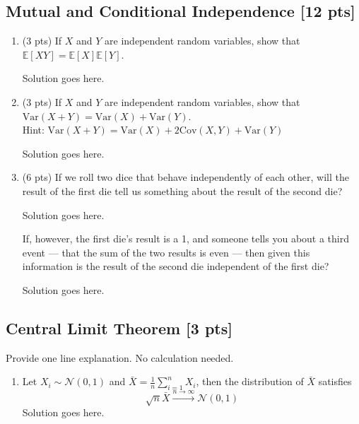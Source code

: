 \documentclass[a4paper]{article}
\theoremstyle{definition}
\newcommand{\Var}{\mathrm{Var}}
\newcommand{\Cov}{\mathrm{Cov}}
\newenvironment{soln}{
    \leavevmode\color{blue}\ignorespaces
}{}
\begin{document}
\subsection{Mutual and Conditional Independence [12 pts]}
\begin{enumerate}
\item (3 pts) If $X$ and $Y$ are independent random variables, show that
  $\mathbb{E}[XY] = \mathbb{E}[X]\mathbb{E}[Y]$.
  
  \begin{soln}  Solution goes here. \end{soln}
  
\item (3 pts) If $X$ and $Y$ are independent random variables, show that
  $\Var(X+Y) = \Var(X) + \Var(Y)$. \\
  Hint: $\Var(X+Y) = \Var(X) + 2\Cov(X, Y) + \Var(Y)$
  
  \begin{soln}  Solution goes here. \end{soln}
 
\item (6 pts) If we roll two dice that behave independently of each
  other, will the result of the first die tell us something about the
  result of the second die? 
  
  \begin{soln}  Solution goes here. \end{soln}
  
  If, however, the first die's result is a 1,
  and someone tells you about a third event --- that the sum of the two
  results is even --- then given this information is the result of the second die
  independent of the first die? 
  
  \begin{soln}  Solution goes here. \end{soln}
\end{enumerate}

\subsection{Central Limit Theorem [3 pts]}
Provide one line explanation. No calculation needed.
\begin{enumerate}
\item Let $X_i\sim\mathcal{N}(0, 1)$ and $\bar{X} = \frac{1}{n}\sum_{i=1}^n X_i$, then the distribution of $\bar{X}$ satisfies 
  $$\sqrt{n}\bar{X}\overset{n\rightarrow\infty}{\longrightarrow}\mathcal{N}(0, 1)$$
  \begin{soln}  Solution goes here. \end{soln}
  
\end{enumerate}
\end{document}
